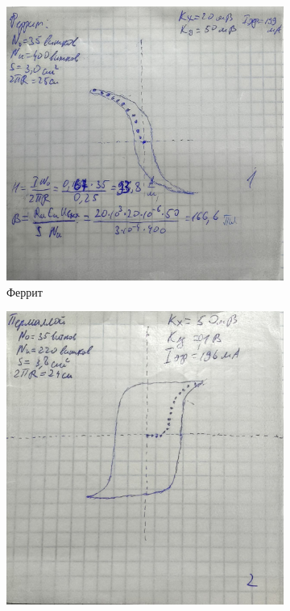 \documentclass[a4paper]{article}
\begin{document}
\begin{figure}[htbp]
    \centering 
    
    \begin{subfigure}[b]{0.3\textwidth} 
        \includegraphics[width=\linewidth]{p1.jpg} 
        \caption{Феррит} 
        \label{fig:image1}
    \end{subfigure}
\hfill 
\begin{subfigure}[b]{0.3\textwidth}
    \includegraphics[width=\linewidth]{p2.jpg}

\end{subfigure}
\end{figure}
\end{document}
